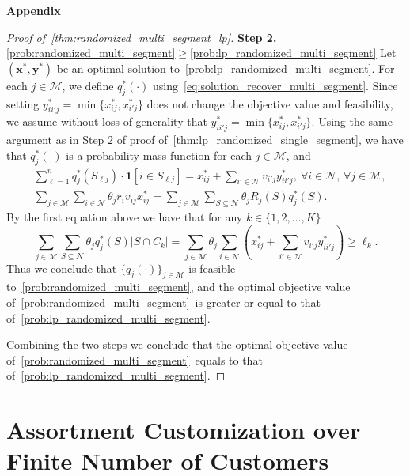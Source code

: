 \documentclass[msom,non-blindrev]{informs3} %
\theoremstyle{definition}
\begin{document}
\begin{appendices}{\Large \noindent\textbf{Appendix}}
\begin{proof}[Proof of~\cref{thm:randomized_multi_segment_lp}]
\underline{\textbf{Step 2.} \eqref{prob:randomized_multi_segment}$\geq$\eqref{prob:lp_randomized_multi_segment}}
Let $(\mathbf{x}^*,\mathbf{y}^*)$ be an optimal solution to~\eqref{prob:lp_randomized_multi_segment}. For each $j\in\mathcal{M}$, we define $q^*_j(\cdot)$ using~\eqref{eq:solution_recover_multi_segment}. Since setting $y^*_{ii'j}=\min\{x^*_{ij},x^*_{i'j}\}$ does not change the objective value and feasibility, we assume without loss of generality that $y^*_{ii'j}=\min\{x^*_{ij},x^*_{i'j}\}$. Using the same argument as in Step 2 of proof of~\cref{thm:lp_randomized_single_segment}, we have that $q^*_j(\cdot)$ is a probability mass function for each $j\in\mathcal{M}$, and
\begin{align*}
&\sum_{\ell=1}^n q^*_j(S_{\ell j})\cdot \bm{1}[i\in S_{\ell j}]=x^*_{ij}+\sum_{i'\in\mathcal{N}}v_{i'j}y^*_{ii'j},\ \forall i\in\mathcal{N},\, \forall j\in\mathcal{M},\\
&\sum_{j\in\mathcal{M}}\sum_{i\in\mathcal{N}}\theta_jr_iv_{ij}x^*_{ij}=\sum_{j\in\mathcal{M}}\sum_{S\subseteq\mathcal{N}}\theta_jR_j(S)q^*_j(S).
\end{align*}
By the first equation above we have that for any $k\in\{1,2,\dots,K\}$
\begin{equation*}
\sum_{j\in\mathcal{M}}\sum_{S\subseteq\mathcal{N}}\theta_jq^*_j(S)|S\cap C_k|=\sum_{j\in\mathcal{M}}\theta_j\sum_{i\in\mathcal{N}}\left(x^*_{ij}+\sum_{i'\in\mathcal{N}}v_{i'j}y^*_{ii'j}\right)\geq\ell_k.
\end{equation*}
Thus we conclude that $\{q_j(\cdot)\}_{j\in\mathcal{M}}$ is feasible to~\eqref{prob:randomized_multi_segment}, and the optimal objective value of~\eqref{prob:randomized_multi_segment}~is greater or equal to that of~\eqref{prob:lp_randomized_multi_segment}. 

Combining the  two steps we conclude that the optimal objective value of~\eqref{prob:randomized_multi_segment}~equals to that of~\eqref{prob:lp_randomized_multi_segment}. %
\end{proof}

{ 

\section{Assortment Customization over Finite Number of Customers}\label{sec:assortment_customization}

}
\end{appendices}
\end{document}
